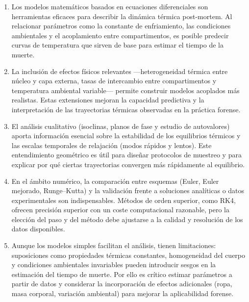 \documentclass[a4paper,10pt]{article}
\begin{document}
\begin{enumerate}
	\item Los modelos matemáticos basados en ecuaciones diferenciales son herramientas eficaces para describir la dinámica térmica post-mortem. Al relacionar parámetros como la constante de enfriamiento, las condiciones ambientales y el acoplamiento entre compartimentos, es posible predecir curvas de temperatura que sirven de base para estimar el tiempo de la muerte.

	\item La inclusión de efectos físicos relevantes —heterogeneidad térmica entre núcleo y capa externa, tasas de intercambio entre compartimentos y temperatura ambiental variable— permite construir modelos acoplados más realistas. Estas extensiones mejoran la capacidad predictiva y la interpretación de las trayectorias térmicas observadas en la práctica forense.

	\item El análisis cualitativo (isoclinas, planos de fase y estudio de autovalores) aporta información esencial sobre la estabilidad de los equilibrios térmicos y las escalas temporales de relajación (modos rápidos y lentos). Este entendimiento geométrico es útil para diseñar protocolos de muestreo y para explicar por qué ciertas trayectorias convergen más rápidamente al equilibrio.

	\item En el ámbito numérico, la comparación entre esquemas (Euler, Euler mejorado, Runge–Kutta) y la validación frente a soluciones analíticas o datos experimentales son indispensables. Métodos de orden superior, como RK4, ofrecen precisión superior con un coste computacional razonable, pero la elección del paso y del método debe ajustarse a la calidad y resolución de los datos disponibles.

	\item Aunque los modelos simples facilitan el análisis, tienen limitaciones: suposiciones como propiedades térmicas constantes, homogeneidad del cuerpo y condiciones ambientales invariables pueden introducir sesgos en la estimación del tiempo de muerte. Por ello es crítico estimar parámetros a partir de datos y considerar la incorporación de efectos adicionales (ropa, masa corporal, variación ambiental) para mejorar la aplicabilidad forense.
\end{enumerate}

\end{document}
